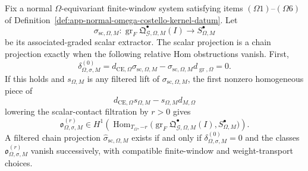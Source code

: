\begin{thm}
\label{thm:app-equivariant-brane-defect-qme-criterion}
  Fix a normal \(\Omega\)-equivariant finite-window system
  satisfying items \((\Omega1)\)--\((\Omega6)\) of
  Definition~\ref{def:app-normal-omega-costello-kernel-datum}.  Let
  \[
    \sigma_{\mathrm{sc},\Omega,M}\colon
    \operatorname{gr}_{F}\mathfrak Q^\bullet_{\mathcal G,\Omega,M}(I)
    \longrightarrow
    S^\bullet_{\Omega,M}
  \]
  be its associated-graded scalar extractor.  The scalar projection is a
  chain projection exactly when the following relative Hom
  obstructions vanish.  First,
  \[
    \delta^{(0)}_{\Omega,\sigma,M}
      =
    d_{\mathrm{CE},\Omega}\sigma_{\mathrm{sc},\Omega,M}
      -
    \sigma_{\mathrm{sc},\Omega,M}d_{\operatorname{gr},\Omega}
      =
    0 .
  \]
  If this holds and \(s_{\Omega,M}\) is any filtered lift of
  \(\sigma_{\mathrm{sc},\Omega,M}\), the first nonzero homogeneous piece
  of
  \[
    d_{\mathrm{CE},\Omega}s_{\Omega,M}
      -
    s_{\Omega,M}d_{M,\Omega}
  \]
  lowering the scalar-contact filtration by \(r>0\) gives
  \[
    \mathfrak o^{(r)}_{\Omega,\sigma,M}
      \in
    H^1\!\left(
      \operatorname{Hom}_{T_\Omega,-r}
      \bigl(
        \operatorname{gr}_{F}
          \mathfrak Q^\bullet_{\mathcal G,\Omega,M}(I),
        S^\bullet_{\Omega,M}
      \bigr)
    \right).
  \]
  A filtered chain projection
  \(\widehat\sigma_{\mathrm{sc},\Omega,M}\) exists if and only if
  \(\delta^{(0)}_{\Omega,\sigma,M}=0\) and the classes
  \(\mathfrak o^{(r)}_{\Omega,\sigma,M}\) vanish successively, with
  compatible finite-window and weight-transport choices.


\end{thm}
